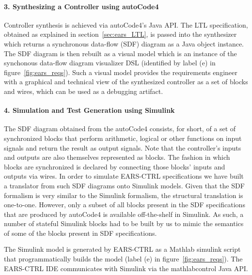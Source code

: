 \paragraph{\textbf{3. Synthesizing a Controller using \textsf{autoCode4}}\\}
\hspace{-.2cm}Controller synthesis is achieved via \textsf{autoCode4}'s Java
API. The LTL specification, obtained as explained in section~\ref{sec:ears_LTL},
is passed into the synthesizer which returns a synchronous data-flow (SDF) diagram as a Java
object instance. The SDF diagram is then rebuilt as a visual model
which is an instance of the synchonous data-flow diagram visualizer DSL
(identified by label (\textsf{e}) in figure~\ref{fig:ears_reqs}). Such a visual
model provides the requirements engineer with a graphical and technical view of
the synthesized controller as a set of blocks and wires, which can be used as a
debugging artifact.\vspace{-.2cm}
\paragraph{\textbf{4. Simulation and Test Generation using Simulink}\\}
\hspace{-.2cm}The SDF diagram obtained from the \textsf{autoCode4} consists, for
short, of a set of synchronized blocks that perform arithmetic, logical or other functions
on input signals and return the result as output signals. Note that the
controller's inputs and outputs are also themselves represented as blocks. The
fashion in which blocks are synchronized is declared by connecting those blocks'
inputs and outputs via wires. In order to simulate \textsf{EARS-CTRL}
specifications we have built a translator from such SDF diagrams onto Simulink
models. Given that the SDF formalism is very similar to the Simulink formalism,
the structural translation is  one-to-one. However, only a subset of all blocks
present in the SDF specifications that are produced by \textsf{autoCode4} is
available off-the-shelf in Simulink. As such, a number of stateful Simulink
blocks had to be built by us to mimic the semantics of some of the blocks
present in SDF specifications.

The Simulink model is generated by \textsf{EARS-CTRL} as a Mathlab simulink
script that programmatically builds the model (label (\textsf{e}) in
figure~\ref{fig:ears_reqs}). The \textsf{EARS-CTRL} IDE
communicates with Simulink via the \textsf{mathlabcontrol}\cite{mathlabcontrol}
Java API.\vspace{-.5cm}
